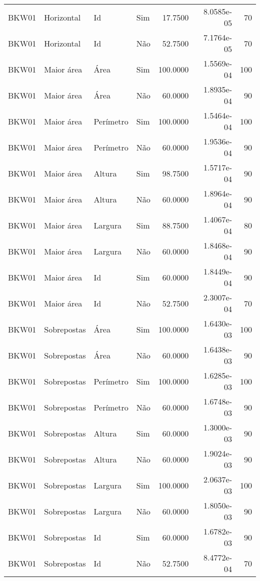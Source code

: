 \begin{tabular}{llllrrr}
    BKW01     & Horizontal  & Id        & Sim         & 17.7500      & 8.0585e-05 & 70       \\
    BKW01     & Horizontal  & Id        & Não         & 52.7500      & 7.1764e-05 & 70       \\
    BKW01     & Maior área  & Área      & Sim         & 100.0000     & 1.5569e-04 & 100      \\
    BKW01     & Maior área  & Área      & Não         & 60.0000      & 1.8935e-04 & 90       \\
    BKW01     & Maior área  & Perímetro & Sim         & 100.0000     & 1.5464e-04 & 100      \\
    BKW01     & Maior área  & Perímetro & Não         & 60.0000      & 1.9536e-04 & 90       \\
    BKW01     & Maior área  & Altura    & Sim         & 98.7500      & 1.5717e-04 & 90       \\
    BKW01     & Maior área  & Altura    & Não         & 60.0000      & 1.8964e-04 & 90       \\
    BKW01     & Maior área  & Largura   & Sim         & 88.7500      & 1.4067e-04 & 80       \\
    BKW01     & Maior área  & Largura   & Não         & 60.0000      & 1.8468e-04 & 90       \\
    BKW01     & Maior área  & Id        & Sim         & 60.0000      & 1.8449e-04 & 90       \\
    BKW01     & Maior área  & Id        & Não         & 52.7500      & 2.3007e-04 & 70       \\
    BKW01     & Sobrepostas & Área      & Sim         & 100.0000     & 1.6430e-03 & 100      \\
    BKW01     & Sobrepostas & Área      & Não         & 60.0000      & 1.6438e-03 & 90       \\
    BKW01     & Sobrepostas & Perímetro & Sim         & 100.0000     & 1.6285e-03 & 100      \\
    BKW01     & Sobrepostas & Perímetro & Não         & 60.0000      & 1.6748e-03 & 90       \\
    BKW01     & Sobrepostas & Altura    & Sim         & 60.0000      & 1.3000e-03 & 90       \\
    BKW01     & Sobrepostas & Altura    & Não         & 60.0000      & 1.9024e-03 & 90       \\
    BKW01     & Sobrepostas & Largura   & Sim         & 100.0000     & 2.0637e-03 & 100      \\
    BKW01     & Sobrepostas & Largura   & Não         & 60.0000      & 1.8050e-03 & 90       \\
    BKW01     & Sobrepostas & Id        & Sim         & 60.0000      & 1.6782e-03 & 90       \\
    BKW01     & Sobrepostas & Id        & Não         & 52.7500      & 8.4772e-04 & 70       \\
    \hline
\end{tabular}